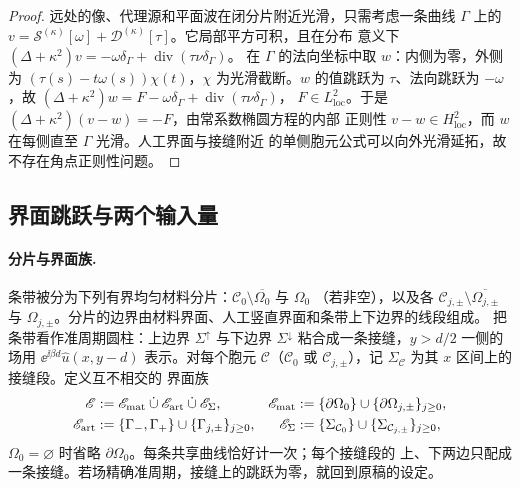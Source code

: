 \begin{proof}
  远处的像、代理源和平面波在闭分片附近光滑，只需考虑一条曲线 $\Gamma$ 上的
  $v=\mathcal S^{(\kappa)}[\omega]+\mathcal D^{(\kappa)}[\tau]$。它局部平方可积，且在分布
  意义下 $(\Delta+\kappa^2)v=-\omega\delta_\Gamma+\operatorname{div}(\tau\nu\delta_\Gamma)$。
  在 $\Gamma$ 的法向坐标中取 $w$：内侧为零，外侧为 $(\tau(s)-t\omega(s))\chi(t)$，$\chi$
  为光滑截断。$w$ 的值跳跃为 $\tau$、法向跳跃为 $-\omega$，故
  $(\Delta+\kappa^2)w=F-\omega\delta_\Gamma+\operatorname{div}(\tau\nu\delta_\Gamma)$，
  $F\in L^2_{\mathrm{loc}}$。于是 $(\Delta+\kappa^2)(v-w)=-F$，由常系数椭圆方程的内部
  正则性 $v-w\in H^2_{\mathrm{loc}}$，而 $w$ 在每侧直至 $\Gamma$ 光滑。人工界面与接缝附近
  的单侧胞元公式可以向外光滑延拓，故不存在角点正则性问题。
\end{proof}

\subsection{界面跳跃与两个输入量}
\label{subsec:jumps}

\paragraph{分片与界面族.}
条带被分为下列有界均匀材料分片：$\mathcal C_0\setminus\overline{\Omega_0}$ 与 $\Omega_0$
（若非空），以及各 $\mathcal C_{j,\pm}\setminus\overline{\Omega_{j,\pm}}$ 与
$\Omega_{j,\pm}$。分片的边界由材料界面、人工竖直界面和条带上下边界的线段组成。
把条带看作准周期圆柱：上边界
$\Sigma^\uparrow$ 与下边界 $\Sigma^\downarrow$ 粘合成一条接缝，$y>d/2$ 一侧的场用
$\ee^{\ii\beta d}\widehat u(x,y-d)$ 表示。对每个胞元 $\mathcal C$（$\mathcal C_0$ 或
$\mathcal C_{j,\pm}$），记 $\Sigma_{\mathcal C}$ 为其 $x$ 区间上的接缝段。定义互不相交的
界面族
\begin{align}
  \mathscr E
  &:=\mathscr E_{\mathrm{mat}}\mathbin{\dot\cup}\mathscr E_{\mathrm{art}}
    \mathbin{\dot\cup}\mathscr E_\Sigma,
  &\mathscr E_{\mathrm{mat}}
  &:=\{\partial\Omega_0\}\cup\{\partial\Omega_{j,\pm}\}_{j\geq0},
  \notag\\
  \mathscr E_{\mathrm{art}}
  &:=\{\Gamma_-,\Gamma_+\}\cup\{\Gamma_{j,\pm}\}_{j\geq0},
  &\mathscr E_\Sigma
  &:=\{\Sigma_{\mathcal C_0}\}\cup\{\Sigma_{\mathcal C_{j,\pm}}\}_{j\geq0},
  \label{eq:interface-family}
\end{align}
$\Omega_0=\varnothing$ 时省略 $\partial\Omega_0$。每条共享曲线恰好计一次；每个接缝段的
上、下两边只配成一条接缝。若场精确准周期，接缝上的跳跃为零，就回到原稿的设定。

